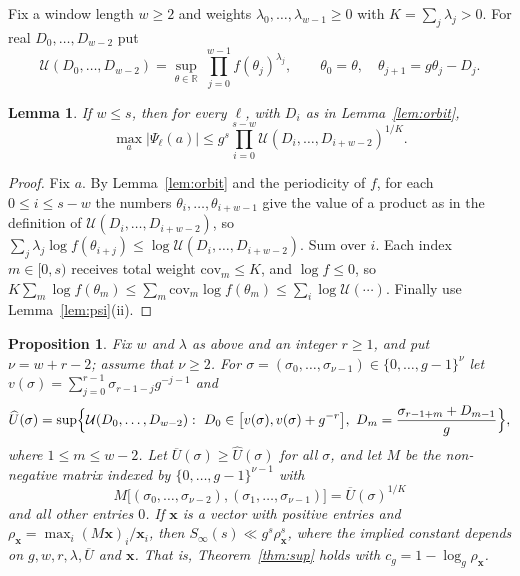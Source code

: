 \documentclass[11pt]{amsart}
\newtheorem{proposition}[theorem]{Proposition}
\newtheorem{lemma}[theorem]{Lemma}
\theoremstyle{definition}
\numberwithin{equation}{section}
\newcommand{\cU}{\mathcal{U}}
\newcommand{\R}{\mathbb{R}}
\newcommand{\Sinf}{S_\infty}
\begin{document}
Fix a window length $w\ge2$ and weights $\lambda_0,\dots,\lambda_{w-1}\ge0$
with $K=\sum_j\lambda_j>0$. For real $D_0,\dots,D_{w-2}$ put
\[
\cU(D_0,\dots,D_{w-2})=\sup_{\theta\in\R}\ \prod_{j=0}^{w-1}f(\theta_j)^{\lambda_j},\qquad
\theta_0=\theta,\quad\theta_{j+1}=g\theta_j-D_j .
\]

\begin{lemma}\label{lem:window}
If $w\le s$, then for every $\ell$, with $D_i$ as in Lemma~\ref{lem:orbit},
\[
\max_a|\Psi_\ell(a)|\le g^s\prod_{i=0}^{s-w}\cU(D_i,\dots,D_{i+w-2})^{1/K}.
\]
\end{lemma}

\begin{proof}
Fix $a$. By Lemma~\ref{lem:orbit} and the periodicity of $f$, for each
$0\le i\le s-w$ the numbers $\theta_i,\dots,\theta_{i+w-1}$ give the value of
a product as in the definition of $\cU(D_i,\dots,D_{i+w-2})$, so
$\sum_j\lambda_j\log f(\theta_{i+j})\le\log\cU(D_i,\dots,D_{i+w-2})$. Sum over
$i$. Each index $m\in[0,s)$ receives total weight
$\mathrm{cov}_m\le K$, and $\log f\le0$, so
$K\sum_m\log f(\theta_m)\le\sum_m\mathrm{cov}_m\log f(\theta_m)\le\sum_i\log\cU(\cdots)$.
Finally use Lemma~\ref{lem:psi}(ii).
\end{proof}

\begin{proposition}\label{prop:windows}
Fix $w$ and $\lambda$ as above and an integer $r\ge1$, and put $\nu=w+r-2$;
assume that $\nu\ge2$. For
$\sigma=(\sigma_0,\dots,\sigma_{\nu-1})\in\{0,\dots,g-1\}^\nu$ let
$v(\sigma)=\sum_{j=0}^{r-1}\sigma_{r-1-j}g^{-j-1}$ and
\[
\widehat U(\sigma)=\sup\Bigl\{\cU(D_0,\dots,D_{w-2}):\
D_0\in\bigl[v(\sigma),v(\sigma)+g^{-r}\bigr],\ D_m=\frac{\sigma_{r-1+m}+D_{m-1}}g\Bigr\},
\]
where $1\le m\le w-2$. Let $\overline U(\sigma)\ge\widehat U(\sigma)$ for all
$\sigma$, and let $M$ be the non-negative matrix indexed by
$\{0,\dots,g-1\}^{\nu-1}$ with
\[
M\bigl[(\sigma_0,\dots,\sigma_{\nu-2}),(\sigma_1,\dots,\sigma_{\nu-1})\bigr]=\overline U(\sigma)^{1/K}
\]
and all other entries $0$. If $\mathbf x$ is a vector with positive entries
and $\rho_{\mathbf x}=\max_i(M\mathbf x)_i/\mathbf x_i$, then
$\Sinf(s)\ll g^s\rho_{\mathbf x}^s$, where the implied constant depends on
$g,w,r,\lambda,\overline U$ and $\mathbf x$. That is, Theorem~\ref{thm:sup} holds with
$c_g=1-\log_g\rho_{\mathbf x}$.
\end{proposition}
\end{document}
